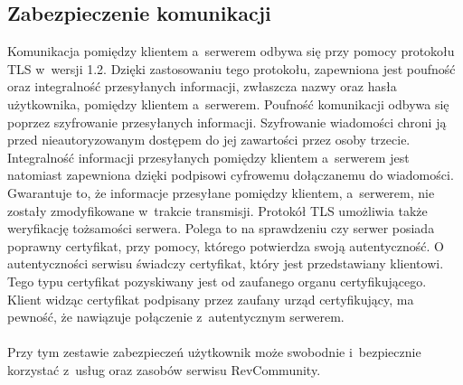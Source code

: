 \subsection{Zabezpieczenie komunikacji}

Komunikacja pomiędzy klientem a~serwerem odbywa się przy pomocy protokołu TLS w~wersji 1.2. Dzięki zastosowaniu tego protokołu, zapewniona jest poufność oraz integralność przesyłanych informacji, zwłaszcza nazwy oraz hasła użytkownika, pomiędzy klientem a~serwerem. Poufność komunikacji odbywa się poprzez szyfrowanie przesyłanych informacji. Szyfrowanie wiadomości chroni ją przed nieautoryzowanym dostępem do jej zawartości przez osoby trzecie.
Integralność informacji przesyłanych pomiędzy klientem a~serwerem jest natomiast zapewniona dzięki podpisowi cyfrowemu dołączanemu do wiadomości. Gwarantuje to, że informacje przesyłane pomiędzy klientem, a~serwerem, nie zostały zmodyfikowane w~trakcie transmisji.
 Protokół TLS umożliwia także weryfikację tożsamości serwera. Polega to na sprawdzeniu czy serwer posiada poprawny certyfikat, przy pomocy, którego potwierdza swoją autentyczność. O autentyczności serwisu świadczy certyfikat, który jest przedstawiany klientowi. Tego typu certyfikat pozyskiwany jest od zaufanego organu certyfikującego. Klient widząc certyfikat podpisany przez zaufany urząd certyfikujący, ma pewność, że nawiązuje połączenie z~autentycznym serwerem.\cite{tls}
\paragraph{}
Przy tym zestawie zabezpieczeń użytkownik może swobodnie i~bezpiecznie korzystać z~usług oraz zasobów serwisu RevCommunity.
